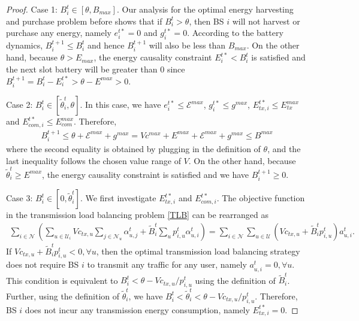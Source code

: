 \documentclass[12pt, draftclsnofoot, letterpaper, onecolumn]{IEEEtran}
\begin{document}
{\begin{proof}
Case 1: $B^t_i \in [\theta, B_{max}]$. Our analysis for the optimal energy harvesting and purchase problem before shows that if $B^t_i > \theta$, then BS $i$ will not harvest or purchase any energy, namely $e^{t*}_i = 0$ and $g^{t*}_i = 0$. According to the battery dynamics, $B^{t+1}_i \leq B^t_i$ and hence $B^{t+1}_i$ will also be less than $B_{max}$. On the other hand, because $\theta > E_{max}$, the energy causality constraint $E^{t*}_i < B^t_i$ is satisfied and the next slot battery will be greater than 0 since $B^{t+1}_i = B^t_i - E^{t*}_i > \theta - E^{max} > 0$.



Case 2: $B^t_i \in [\tilde{\theta}^t_i, \theta]$. In this case, we have $e^{t*}_i \leq \mathcal{E}^{max}$, $g^{t*}_i \leq g^{max}$, $E^{t*}_{tx, i} \leq E^{max}_{tx}$ and $E^{t*}_{com, i} \leq E^{max}_{com}$. Therefore,
\begin{align}
B^{t+1}_i \leq \theta + \mathcal{E}^{max} + g^{max} = Vc^{max} + E^{max} + \mathcal{E}^{max} + g^{max} \leq B^{max}
\end{align}
where the second equality is obtained by plugging in the definition of $\theta$, and the last inequality follows the chosen value range of $V$. On the other hand, because $\tilde{\theta}^t_i \geq E^{max}$, the energy causality constraint is satisfied and we have $B^{t+1}_i \geq 0$.

Case 3: $B^t_i \in [0, \tilde{\theta}^t_i]$. We first investigate $E^{t*}_{tx,i}$ and $E^{t*}_{com,i}$. The objective function in the transmission load balancing problem \eqref{TLB} can be rearranged as
\begin{align}
\sum_{i\in\mathcal{N}} \left( \sum_{u\in\mathcal{U}_i}Vc_{tx,u}\sum_{j\in\mathcal{N}_u}\alpha^t_{u,j} + \tilde{B}^t_{i}\sum_{u} p^t_{i,u}\alpha^t_{u,i}\right)
=\sum_{i\in\mathcal{N}}\sum_{u\in \mathcal{U}}(Vc_{tx,u} + \tilde{B}^t_i p^t_{i,u})a^t_{u,i}.
\end{align}
If $Vc_{tx,u} + \tilde{B}^t_i p^t_{i,u} < 0, \forall u$, then the optimal transmission load balancing strategy does not require BS $i$ to transmit any traffic for any user, namely $a^t_{u,i} = 0, \forall u$. This condition is equivalent to $B^t_i < \theta - Vc_{tx,u}/p^t_{i,u}$ using the definition of $\tilde{B}^t_i$. Further, using the definition of $\tilde{\theta}^t_i$, we have $B^t_{i} < \tilde{\theta}^t_i < \theta - Vc_{tx,u}/p^t_{i,u}$. Therefore, BS $i$ does not incur any transmission energy consumption, namely $E^{t*}_{tx,i} = 0$.


\end{proof}}
\end{document}
